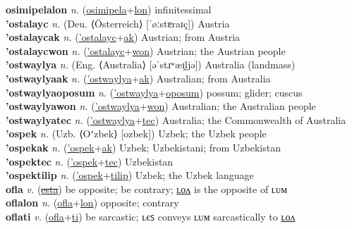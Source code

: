 \textbf{osimipelalon} \textit{n.} (\hyperref[osimipela]{osimipela}+\hyperref[lon]{lon})
infinitessimal \label{osimipelalon} \\
\textbf{'ostalayc} \textit{n.} (Deu. ⟨Österreich⟩ [ˈøːstɐraɪç])
Austria \label{'ostalayc} \\
\textbf{'ostalaycak} \textit{n.} (\hyperref['ostalayc]{'ostalayc}+\hyperref[ak]{ak})
Austrian; from Austria \label{'ostalaycak} \\
\textbf{'ostalaycwon} \textit{n.} (\hyperref['ostalayc]{'ostalayc}+\hyperref[won]{won})
Austrian; the Austrian people \label{'ostalaycwon} \\
\textbf{'ostwaylya} \textit{n.} (Eng. ⟨Australia⟩ [əˈstɹʷæɪ̯ljə])
Australia (landmass) \label{'ostwaylya} \\
\textbf{'ostwaylyaak} \textit{n.} (\hyperref['ostwaylya]{'ostwaylya}+\hyperref[ak]{ak})
Australian; from Australia \label{'ostwaylyaak} \\
\textbf{'ostwaylyaoposum} \textit{n.} (\hyperref['ostwaylya]{'ostwaylya}+\hyperref[oposum]{oposum})
possum; glider; cuscus \label{'ostwaylyaoposum} \\
\textbf{'ostwaylyawon} \textit{n.} (\hyperref['ostwaylya]{'ostwaylya}+\hyperref[won]{won})
Australian; the Australian people \label{'ostwaylyawon} \\
\textbf{'ostwaylyatec} \textit{n.} (\hyperref['ostwaylya]{'ostwaylya}+\hyperref[tec]{tec})
Australia; the Commonwealth of Australia \label{'ostwaylyatec} \\
\textbf{'ospek} \textit{n.} (Uzb. ⟨Oʻzbek⟩ [ozbek])
Uzbek; the Uzbek people \label{'ospek} \\
\textbf{'ospekak} \textit{n.} (\hyperref['ospek]{'ospek}+\hyperref[ak]{ak})
Uzbek; Uzbekistani; from Uzbekistan \label{'ospekak} \\
\textbf{'ospektec} \textit{n.} (\hyperref['ospek]{'ospek}+\hyperref[tec]{tec})
Uzbekistan \label{'ospektec} \\
\textbf{'ospektilip} \textit{n.} (\hyperref['ospek]{'ospek}+\hyperref[tilip]{tilip})
Uzbek; the Uzbek language \label{'ospektilip} \\
\textbf{ofla} \textit{v.} (\hyperref[esta]{\sout{esta}})
be opposite; be contrary; \hyperref[oflalon]{ʟᴏᴧ} is the opposite of ʟᴜᴍ \label{ofla} \\
\textbf{oflalon} \textit{n.} (\hyperref[ofla]{ofla}+\hyperref[lon]{lon})
opposite; contrary \label{oflalon} \\
\textbf{oflati} \textit{v.} (\hyperref[ofla]{ofla}+\hyperref[ti]{ti})
be sarcastic; ʟєꜱ conveys ʟᴜᴍ sarcastically to \hyperref[oflatilon]{ʟᴏᴧ} \label{oflati} \\
